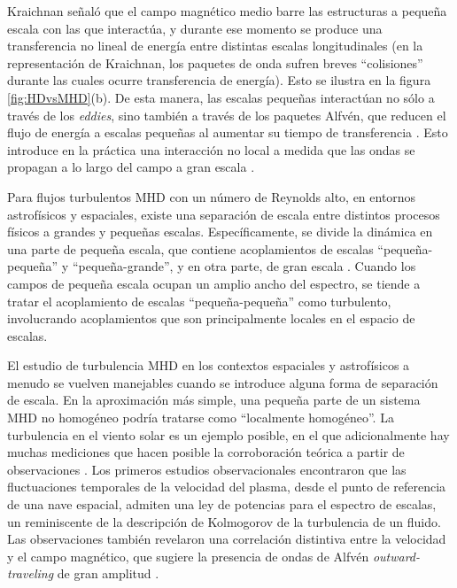 Kraichnan \cite{kraichnan_inertial-range_1965} señaló que el campo
magnético medio barre las estructuras a pequeña escala con las que
interactúa, y durante ese momento se produce una transferencia no
lineal de energía entre distintas escalas longitudinales (en la
representación de Kraichnan, los paquetes de onda sufren breves
``colisiones'' durante las cuales ocurre transferencia de
energía). Esto se ilustra en la figura \ref{fig:HDvsMHD}(b). De esta
manera, las escalas pequeñas interactúan no sólo a través de los
\textit{eddies}, sino también a través de los paquetes Alfv\'en, que
reducen el flujo de energía a escalas pequeñas al aumentar su tiempo
de transferencia \cite{chen_inhibition_1997}. Esto introduce en la
práctica una interacción no local a medida que las ondas se propagan a
lo largo del campo a gran escala \cite{gomez_validity_1999}.



Para flujos turbulentos MHD con un número de Reynolds alto, en
entornos astrofísicos y espaciales, existe una separación de escala
entre distintos procesos físicos a grandes y pequeñas
escalas. Específicamente, se divide la dinámica en una parte de
pequeña escala, que contiene acoplamientos de escalas
``pequeña-pequeña'' y ``pequeña-grande'', y en otra parte, de gran
escala \cite{zhou_transport_1990}. Cuando los campos de pequeña escala
ocupan un amplio ancho del espectro, se tiende a tratar el
acoplamiento de escalas ``pequeña-pequeña'' como turbulento,
involucrando acoplamientos que son principalmente locales en el
espacio de escalas.

El estudio de turbulencia MHD en los contextos espaciales y
astrofísicos a menudo se vuelven manejables cuando se introduce alguna
forma de separación de escala. En la aproximación más simple, una
pequeña parte de un sistema MHD no homogéneo podría tratarse como
``localmente homogéneo''. La turbulencia en el viento solar es un
ejemplo posible, en el que adicionalmente hay muchas mediciones que
hacen posible la corroboración teórica a partir de observaciones
\cite{tu_mhd_1995, goldstein_magnetohydrodynamic_1995}. Los primeros
estudios observacionales \cite{coleman_turbulence_1968} encontraron
que las fluctuaciones temporales de la velocidad del plasma, desde el
punto de referencia de una nave espacial, admiten una ley de potencias
para el espectro de escalas, un reminiscente de la descripción de
Kolmogorov de la turbulencia de un fluido. Las observaciones también
revelaron una correlación distintiva entre la velocidad y el campo
magnético, que sugiere la presencia de ondas de Alfv\'en
\textit{outward-traveling} de gran amplitud
\cite{coleman_turbulence_1968, belcher_large-amplitude_1971,
jokipii_turbulence_1973}.

